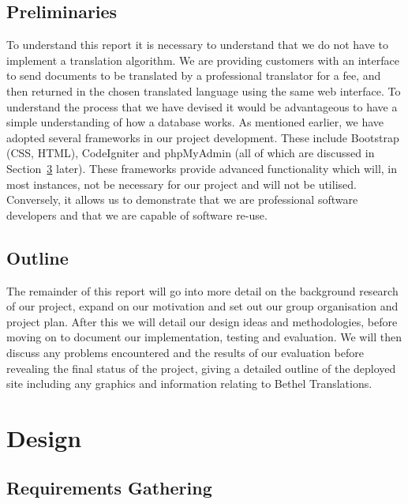 \documentclass{l3proj}
\begin{document}
\section{Preliminaries}
To understand this report it is necessary to understand that we do not have to implement a translation algorithm. We are providing customers with an interface to send documents to be translated by a professional translator for a fee, and then returned in the chosen translated language using the same web interface. To understand the process that we have devised it would be advantageous to have a simple understanding of how a database works. As mentioned earlier, we have adopted several frameworks in our project development. These include Bootstrap (CSS, HTML), CodeIgniter and phpMyAdmin (all of which are discussed in Section~\ref{chap:design} later). These frameworks provide advanced functionality which will, in most instances, not be necessary for our project and will not be utilised. Conversely, it allows us to demonstrate that we are professional software developers and that we are capable of software re-use.

\section{Outline}
The remainder of this report will go into more detail on the background research of our project, expand on our motivation and set out our group organisation and project plan. After this we will detail our design ideas and methodologies, before moving on to document our implementation, testing and evaluation. We will then discuss any problems encountered and the results of our evaluation before revealing the final status of the project, giving a detailed outline of the deployed site including any graphics and information relating to Bethel Translations.
 

\chapter{Design}
\label{chap:design}
\section{Requirements Gathering}
\end{document}
